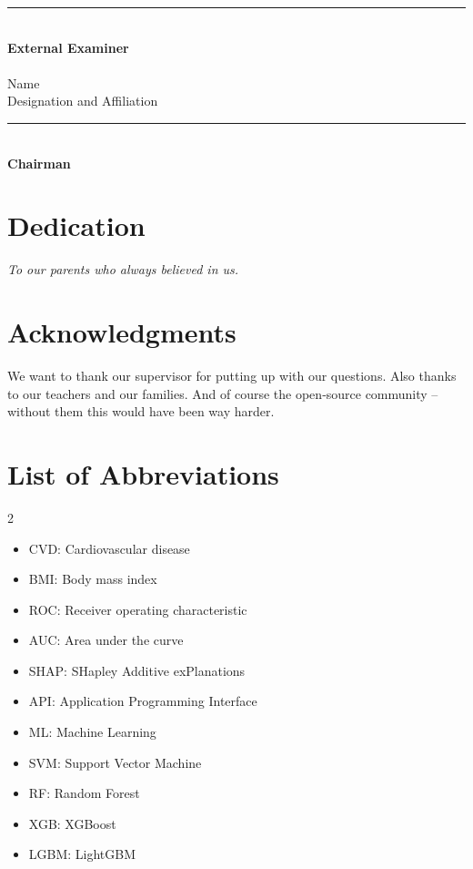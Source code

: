 \documentclass[12pt, a4paper, oneside]{book}
\begin{document}
\vspace{0.6in}

\noindent \rule{2.2in}{0.4pt}\\
\textbf{External Examiner}\\
\\
Name\\
Designation and Affiliation

\vspace{0.6in}

\noindent \rule{2.2in}{0.4pt}\\
\textbf{Chairman}

\clearpage
\thispagestyle{plain}
\chapter*{Dedication}
\begin{center}
\emph{To our parents who always believed in us.}
\end{center}

\clearpage
\thispagestyle{plain}
\chapter*{Acknowledgments}
We want to thank our supervisor for putting up with our questions. Also thanks to our teachers and our families. And of course the open‑source community – without them this would have been way harder.

\clearpage
{}
{}
\tableofcontents
\clearpage
{}
{}
\listoffigures
\clearpage
{}
{}
\listoftables

\clearpage
\thispagestyle{plain}
\chapter*{List of Abbreviations}
\begin{multicols}{2}
\begin{itemize}
\item CVD: Cardiovascular disease
\item BMI: Body mass index
\item ROC: Receiver operating characteristic
\item AUC: Area under the curve
\item SHAP: SHapley Additive exPlanations
\item API: Application Programming Interface
\item ML: Machine Learning
\item SVM: Support Vector Machine
\item RF: Random Forest
\item XGB: XGBoost
\item LGBM: LightGBM
\end{itemize}
\end{multicols}
\end{document}
